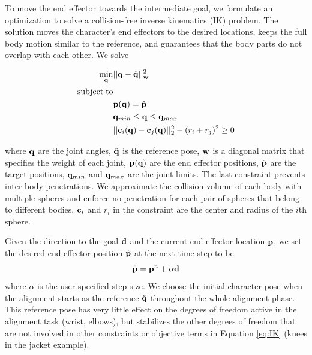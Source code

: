 
To move the end effector towards the intermediate goal, we formulate an
optimization to solve a collision-free inverse kinematics (IK) problem.
The solution moves the character's end effectors to the desired locations,
keeps the full body motion similar to the reference, and guarantees that
the body parts do not overlap with each other. We solve

\begin{align}
\label{eq:IK}
  \min_{\mathbf{q}} & ||\mathbf{q} - \hat{\mathbf{q}}||_{\mathbf{w}}^2 \\
  \nonumber  \mathrm{subject\;} \mathrm{to} & \\
  \nonumber  &\mathbf{p}(\mathbf{q}) = \hat{\mathbf{p}}\\
  \nonumber   &\mathbf{q}_{min} \leq \mathbf{q} \leq \mathbf{q}_{max}\\
  \nonumber   &||\mathbf{c}_i(\mathbf{q}) - \mathbf{c}_j(\mathbf{q})||_2^2 - (r_i + r_j)^2 \geq 0
\end{align}

where $\mathbf{q}$ are the joint angles, $\hat{\mathbf{q}}$ is the reference pose, $\mathbf{w}$ is a diagonal matrix that specifies the weight of each joint, $\mathbf{p}(\mathbf{q})$ are the end effector positions, $\hat{\mathbf{p}}$ are the target positions, $\mathbf{q}_{min}$ and $\mathbf{q}_{max}$ are the joint limits. The last constraint prevents inter-body penetrations. We approximate the collision volume of each body with multiple spheres and enforce no penetration for each pair of spheres that belong to different bodies. $\mathbf{c}_i$ and $r_i$ in the constraint are the center and radius of the $i$th sphere.

Given the direction to the goal $\mathbf{d}$ and the current end effector location $\mathbf{p}$, we set the desired end effector position $\hat{\mathbf{p}}$ at the next time step to be
\begin{equation}
  \hat{\mathbf{p}} = \mathbf{p}^n+\alpha\mathbf{d}
  \label{eq:target}
\end{equation}
where $\alpha$ is the user-specified step size. We choose the initial character pose when the alignment starts as the reference $\hat{\mathbf{q}}$ throughout the whole alignment phase. This reference pose has very little effect on the degrees of freedom active in the alignment task (\eg wrist, elbows), but stabilizes the other degrees of freedom that are not involved in other constraints or objective terms in Equation \ref{eq:IK} (\eg knees in the jacket example).

